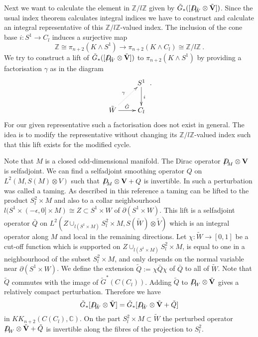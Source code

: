 \documentclass[12pt]{article}
\newcommand{\Z}{{\mathbb{Z}}}
\newcommand{\C}{{\mathbb{C}}}
\newcommand{\bV}{{\mathbf{V}}}
\newcommand{\Dirac}{{D\hspace{-0.27cm}/}}
\begin{document}
Next we want to calculate the element in $\Z/l\Z$ given by $\tilde G_{*}([\Dirac_{\tilde W}\otimes \tilde \bV])$. Since the usual index theorem \cite{MR0236950} calculates integral indices we have to construct and calculate an integral representative of this $\Z/l\Z$-valued index. 
 The inclusion of the cone base
$i:S^{1}\to C_{l}$ induces a surjective map
$$\Z\cong \pi_{n+2}(K\wedge S^{1})\to \pi_{n+2}(K\wedge C_{l})\cong \Z/l\Z\ .$$
We try to construct a lift of
$\tilde G_{*}([\Dirac_{\tilde W}\otimes \tilde \bV])$ to $\pi_{n+2}(K\wedge S^{1})$
by providing a factorisation  $\gamma$ as in the diagram
$$\xymatrix{&S^{1}\ar[d]^{i}\\\tilde W\ar@{..>}[ur]^{\gamma}\ar[r]^{\tilde G}&C_{l}}\ .$$
For our given representative such a factorisation does not exist in general. The idea is to modify 
the representative  without changing its $\Z/l\Z$-valued index such that this lift exists for the modified cycle.

Note that $M$ is a closed odd-dimensional manifold. The Dirac operator $\Dirac_{M}\otimes \bV$ is 
selfadjoint. We can find a selfadjoint smoothing operator $Q$ on $L^{2} (M,S(M)\otimes V)$
such that $\Dirac_{M}\otimes \bV+Q$ is invertible.
In \cite{MR2191484} such a perturbation was called a taming.
As described in this reference a taming can be lifted to the product
$S^{2}_{l}\times M$ and also to a collar neighbourhood  $l(S^{1}\times (-\epsilon,0]\times M) \cong Z\subset S^{1}\times W$ of  $\partial (S^{1}\times  W)$. This lift is a selfadjoint operator $\bar Q$ on $L^{2}(Z\cup_{l(S^{1}\times M)} S^{2}_{l}\times M,S(\tilde W)\otimes \tilde V)$ which is an integral operator along $M$ and local in the remaining directions. Let $\chi:\tilde W\to [0,1]$ be a cut-off function which is supported on
$Z\cup_{l(S^{1}\times M)} S^{2}_{l}\times M$,  is  equal to one in a neighbourhood of the subset $S^{2}_{l}\times M$, and only depends on the normal variable near
$\partial (S^{1}\times W)$. We define the extension $\tilde Q:=\chi \bar Q \chi$ of $\bar Q$ to all of 
$\tilde W$. Note that $\tilde Q$ commutes with the image of $\tilde G^{*}(C(C_{l}))$.
Adding $\tilde Q$ to $\Dirac_{W}\otimes \tilde \bV$ gives a relatively compact perturbation.
Therefore we have
$$\tilde G_{*}[\Dirac_{\tilde W}\otimes \tilde \bV]= \tilde G_{*}[\Dirac_{\tilde W}\otimes \tilde \bV+\tilde Q]$$ in $KK_{n+2}(C(C_{l}),\C)$.
On the part $S^{2}_{l}\times M\subset \tilde W$ the perturbed operator $\Dirac_{W}\otimes \tilde \bV+\tilde Q$ is invertible along the fibres of the projection to $S^{2}_{l}$.
\end{document}
